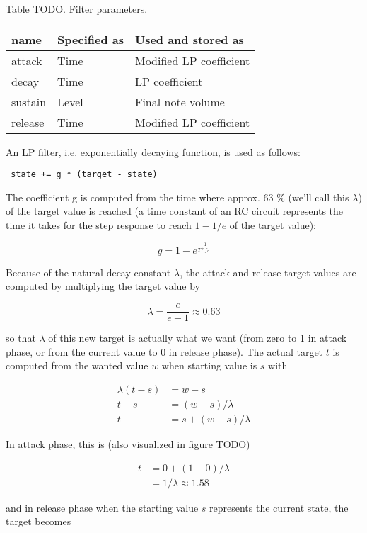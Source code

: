 \documentclass[10pt,a4paper,oneside]{article}
\begin{document}
Table TODO. Filter parameters.

\begin{tabular}{l l l}
	name	&	Specified as&	Used and stored as\\
	\hline
	attack	&	Time		&	Modified LP coefficient\\
	decay	&	Time		&	LP coefficient\\
	sustain	&	Level		&	Final note volume\\
	release	&	Time		&	Modified LP coefficient
\end{tabular}

An LP filter, i.e. exponentially decaying function, is used as follows:

\begin{verbatim}
 state += g * (target - state)
\end{verbatim}

The coefficient g is computed from the time where approx. 63 \% (we'll call this $\lambda$) of the target value is reached (a time constant of an RC circuit represents the time it takes for the step response to reach $1-1/e$ of the target value):

\[
 g = 1 - e^{\frac{-1}{T * f_c}}
\]

Because of the natural decay constant $\lambda$, the attack and release target values are computed by multiplying the target value by

\[
 \lambda = \frac{e}{e-1} \approx 0.63
\]

so that $\lambda$ of this new target is actually what we want (from zero to 1 in attack phase, or from the current value to 0 in release phase). The actual target $t$ is computed from the wanted value $w$ when starting value is $s$ with

\[
\begin{split}
 \lambda (t - s) &= w - s\\
 t - s &= (w - s) / \lambda\\
 t &= s + (w - s) / \lambda
\end{split}
\]

In attack phase, this is (also visualized in figure TODO)

\[
\begin{split}
 t &= 0 + (1 - 0) / \lambda\\
   &= 1 / \lambda \approx 1.58
\end{split}
\]

and in release phase when the starting value $s$ represents the current state, the target becomes
\end{document}
